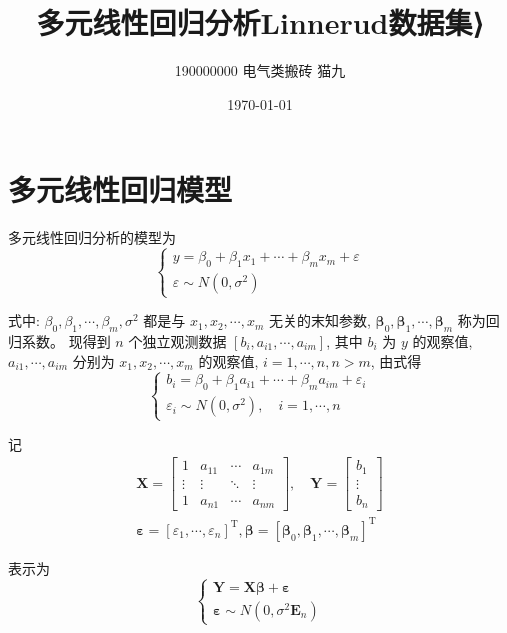 \documentclass[a4paper,12pt]{article}
\title{多元线性回归分析Linnerud数据集⟩}
\author{190000000 \quad 电气类搬砖 \quad 猫九}
\date{\today}
\begin{document}
\maketitle
	
\section{多元线性回归模型}
多元线性回归分析的模型为
$$
\left\{\begin{array}{l}
	y=\beta_{0}+\beta_{1} x_{1}+\cdots+\beta_{m} x_{m}+\varepsilon \\
	\varepsilon \sim N\left(0, \sigma^{2}\right)
\end{array}\right.
$$

式中: $\beta_{0}, \beta_{1}, \cdots, \beta_{m}, \sigma^{2}$ 都是与 $x_{1}, x_{2}, \cdots, x_{m}$ 无关的末知参数, $\boldsymbol{\beta}_{0}, \boldsymbol{\beta}_{1}, \cdots, \boldsymbol{\beta}_{m}$ 称为回归系数。
现得到 $n$ 个独立观测数据 $\left[b_{i}, a_{i 1}, \cdots, a_{i m}\right]$, 其中 $b_{i}$ 为 $y$ 的观察值, $a_{i 1}, \cdots, a_{i m}$ 分别为 $x_{1}, x_{2}, \cdots, x_{m}$ 的观察值, $i=1, \cdots, n, n>m$, 由式得
$$
\left\{\begin{array}{l}
	b_{i}=\beta_{0}+\beta_{1} a_{i 1}+\cdots+\beta_{m} a_{i m}+\varepsilon_{i} \\
	\varepsilon_{i} \sim N\left(0, \sigma^{2}\right), \quad i=1, \cdots, n
\end{array}\right.
$$

记
$$
\begin{gathered}
	\boldsymbol{X}=\left[\begin{array}{cccc}
		1 & a_{11} & \cdots & a_{1 m} \\
		\vdots & \vdots & \ddots & \vdots \\
		1 & a_{n 1} & \cdots & a_{n m}
	\end{array}\right], \quad \boldsymbol{Y}=\left[\begin{array}{c}
		b_{1} \\
		\vdots \\
		b_{n}
	\end{array}\right] \\
	\boldsymbol{\varepsilon}=\left[\varepsilon_{1}, \cdots, \varepsilon_{n}\right]^{\mathrm{T}}, \boldsymbol{\beta}=\left[\boldsymbol{\beta}_{0}, \boldsymbol{\beta}_{1}, \cdots, \boldsymbol{\beta}_{m}\right]^{\mathrm{T}}
\end{gathered}
$$

表示为
$$
\left\{\begin{array}{l}
	\boldsymbol{Y}=\boldsymbol{X} \boldsymbol{\beta}+\boldsymbol{\varepsilon} \\
	\boldsymbol{\varepsilon} \sim N\left(0, \sigma^{2} \boldsymbol{E}_{n}\right)
\end{array}\right.
$$
\end{document}
